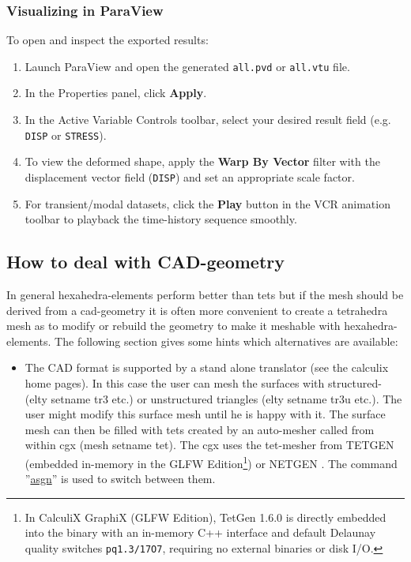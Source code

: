 \documentclass{article}
\providecommand{\htmlref}[2]{\hyperref[#2]{#1}}
\begin{document}
\begin{appendix}
\subsubsection{Visualizing in ParaView}
To open and inspect the exported results:
\begin{enumerate}
\item Launch ParaView and open the generated \texttt{all.pvd} or \texttt{all.vtu} file.
\item In the Properties panel, click \textbf{Apply}.
\item In the Active Variable Controls toolbar, select your desired result field (e.g. \texttt{DISP} or \texttt{STRESS}).
\item To view the deformed shape, apply the \textbf{Warp By Vector} filter with the displacement vector field (\texttt{DISP}) and set an appropriate scale factor.
\item For transient/modal datasets, click the \textbf{Play} button in the VCR animation toolbar to playback the time-history sequence smoothly.
\end{enumerate}

\subsection{\label{How to deal with CAD-geometry}How to deal with CAD-geometry}
In general hexahedra-elements perform better than tets but if the mesh should be derived from a cad-geometry it is often more convenient to create a tetrahedra mesh as to modify or rebuild the geometry to make it meshable with hexahedra-elements. The following section gives some hints which alternatives are available:

\begin{itemize}

\item The CAD format is supported by a stand alone translator (see the calculix home pages). In this case the user can mesh the surfaces with structured- \cite{Coons} (elty setname tr3 etc.) or unstructured triangles \cite{mesh2d} (elty setname tr3u etc.). The user might modify this surface mesh until he is happy with it. The surface mesh can then be filled with tets created by an auto-mesher called from within cgx (mesh setname tet). The cgx uses the tet-mesher from TETGEN \cite{TETGEN} (embedded in-memory in the GLFW Edition\footnote{In CalculiX GraphiX (GLFW Edition), TetGen 1.6.0 is directly embedded into the binary with an in-memory C++ interface and default Delaunay quality switches \texttt{pq1.3/17O7}, requiring no external binaries or disk I/O.}) or NETGEN \cite{NETGEN}. The command ''\htmlref{asgn}{asgn}'' is used to switch between them.


\end{itemize}
\end{appendix}
\end{document}
